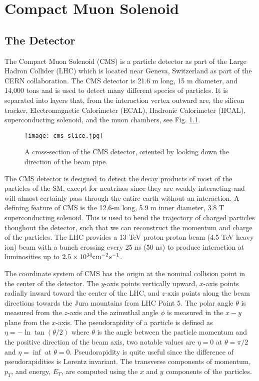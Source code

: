 \chapter{Compact Muon Solenoid}
\label{ch:CMS}

\section{The Detector}
\label{sec:cmsIntro}

The Compact Muon Solenoid (CMS) is a particle detector as part of the Large Hadron Collider (LHC) which is located near Geneva, Switzerland as part of the CERN collaboration. The CMS detector is 21.6 m long, 15 m diameter, and 14,000 tons and is used to detect many different species of particles. It is separated into layers that, from the interaction vertex outward are, the silicon tracker, Electromagnetic Calorimeter (ECAL), Hadronic Calorimeter (HCAL), superconducting solenoid, and the muon chambers, see Fig. \ref{CMSSlice}. 

\begin{figure}
 	\centering
	\texttt{[image: cms\_slice.jpg]}
 	\caption[CMS Cross Section]{A cross-section of the CMS detector, oriented by looking down the direction of the beam pipe. }
 	\label{CMSSlice} 
\end{figure}

The CMS detector is designed to detect the decay products of most of the particles of the SM, except for neutrinos since they are weakly interacting and will almost certainly pass through the entire earth without an interaction. A defining feature of CMS is the 12.6-m long, 5.9 m inner diameter, 3.8 T superconducting solenoid. This is used to bend the trajectory of charged particles thoughout the detector, such that we can reconstruct the momentum and charge of the particles. The LHC provides a 13 TeV proton-proton beam (4.5 TeV heavy ion) beam with a bunch crossing every 25 ns (50 ns) to produce interaction at luminosities up to $2.5\times10^{34} \text{cm}^{-2}s^{-1}$. 

The coordinate system of CMS has the origin at the nominal collision point in the center of the detector. The $y$-axis points vertically upward, $x$-axis points radially inward toward the center of the LHC, and $z$-axis points along the beam directions towards the Jura mountains from LHC Point 5. The polar angle $\theta$ is measured from the $z$-axis and the azimuthal angle $\phi$ is measured in the $x-y$ plane from the $x$-axis. The pseudorapidity of a particle is defined as $\eta=-\ln\tan(\theta/2)$ where $\theta$ is the angle between the particle momentum and the positive direction of the beam axis, two notable values are $\eta=0$ at $\theta=\pi/2$ and $\eta=\inf$ at $\theta=0$. Pseudorapidity is quite useful since the difference of pseudorapidities is Lorentz invariant. The transverse components of momentum, $p_T$, and energy, $E_T$, are computed using the $x$ and $y$ components of the particles. 

